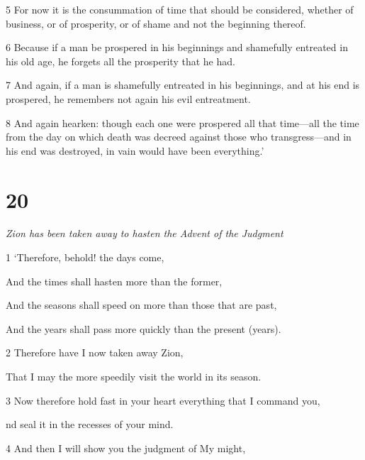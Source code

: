 \par 5 For now it is the consummation of time that should be considered, whether of business, or of prosperity, or of shame and not the beginning thereof. 

\par 6 Because if a man be prospered in his beginnings and shamefully entreated in his old age, he forgets all the prosperity that he had. 

\par 7 And again, if a man is shamefully entreated in his beginnings, and at his end is prospered, he remembers not again his evil entreatment. 

\par 8 And again hearken: though each one were prospered all that time—all the time from the day on which death was decreed against those who transgress—and in his end was destroyed, in vain would have been everything.’

\chapter{20}

\par \textit{Zion has been taken away to hasten the Advent of the Judgment}

\par 1 ‘Therefore, behold! the days come,

\par And the times shall hasten more than the former,

\par And the seasons shall speed on more than those that are past,

\par And the years shall pass more quickly than the present (years).

\par 2 Therefore have I now taken away Zion,

\par That I may the more speedily visit the world in its season.

\par 3 Now therefore hold fast in your heart everything that I command you,

\par nd seal it in the recesses of your mind.

\par 4 And then I will show you the judgment of My might,

